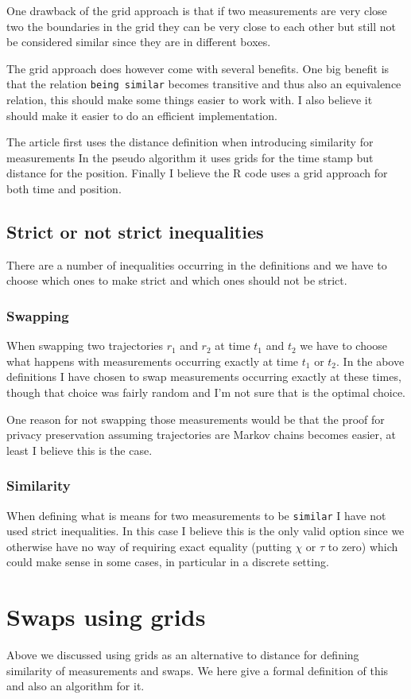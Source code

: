 \documentclass[11pt]{article}
\begin{document}
One drawback of the grid approach is that if two measurements are very
close two the boundaries in the grid they can be very close to each
other but still not be considered similar since they are in different
boxes.

The grid approach does however come with several benefits. One big
benefit is that the relation \texttt{being similar} becomes transitive and
thus also an equivalence relation, this should make some things easier
to work with. I also believe it should make it easier to do an
efficient implementation.

The article first uses the distance definition when introducing
similarity for measurements In the pseudo algorithm it uses grids for
the time stamp but distance for the position. Finally I believe the R
code uses a grid approach for both time and position.
\subsection{Strict or not strict inequalities}
\label{sec:orgc398e40}
There are a number of inequalities occurring in the definitions and we
have to choose which ones to make strict and which ones should not be
strict.
\subsubsection{Swapping}
\label{sec:orga86a350}
When swapping two trajectories \(r_1\) and \(r_2\) at time \(t_1\) and
\(t_2\) we have to choose what happens with measurements occurring
exactly at time \(t_1\) or \(t_2\). In the above definitions I have
chosen to swap measurements occurring exactly at these times, though
that choice was fairly random and I'm not sure that is the optimal
choice.

One reason for not swapping those measurements would be that the proof
for privacy preservation assuming trajectories are Markov chains
becomes easier, at least I believe this is the case.
\subsubsection{Similarity}
\label{sec:org9bb01f9}
When defining what is means for two measurements to be \texttt{similar} I
have not used strict inequalities. In this case I believe this is the
only valid option since we otherwise have no way of requiring exact
equality (putting \(\chi\) or \(\tau\) to zero) which could make sense
in some cases, in particular in a discrete setting.
\section{Swaps using grids}
\label{sec:org115e117}
Above we discussed using grids as an alternative to distance for
defining similarity of measurements and swaps. We here give a formal
definition of this and also an algorithm for it.
\end{document}
